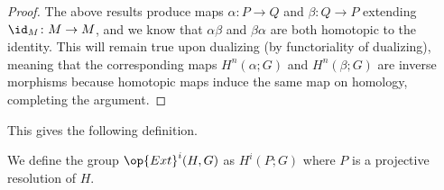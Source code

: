 \documentclass[../notes.tex]{subfiles}
\begin{document}
\begin{proof}
	The above results produce maps $\alpha\colon P\to Q$ and $\beta\colon Q\to P$ extending $\id_M\colon M\to M$, and we know that $\alpha\beta$ and $\beta\alpha$ are both homotopic to the identity. This will remain true upon dualizing (by functoriality of dualizing), meaning that the corresponding maps $H^n(\alpha;G)$ and $H^n(\beta;G)$ are inverse morphisms because homotopic maps induce the same map on homology, completing the argument.
\end{proof}
This gives the following definition.
\begin{defihelper} 
	We define the group $\op{Ext}^i(H,G)$ as $H^i(P;G)$ where $P$ is a projective resolution of $H$.
\end{defihelper}
\end{document}
